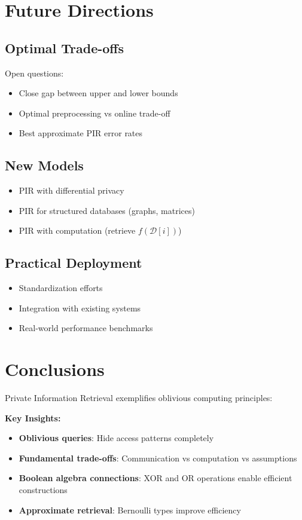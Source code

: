 \documentclass[11pt,final]{article}
\newcommand{\DB}{\mathcal{D}}
\begin{document}
\section{Future Directions}

\subsection{Optimal Trade-offs}

Open questions:
\begin{itemize}
    \item Close gap between upper and lower bounds
    \item Optimal preprocessing vs online trade-off
    \item Best approximate PIR error rates
\end{itemize}

\subsection{New Models}

\begin{itemize}
    \item PIR with differential privacy
    \item PIR for structured databases (graphs, matrices)
    \item PIR with computation (retrieve $f(\DB[i])$)
\end{itemize}

\subsection{Practical Deployment}

\begin{itemize}
    \item Standardization efforts
    \item Integration with existing systems
    \item Real-world performance benchmarks
\end{itemize}

\section{Conclusions}

Private Information Retrieval exemplifies oblivious computing principles:

\textbf{Key Insights:}
\begin{itemize}
    \item \textbf{Oblivious queries}: Hide access patterns completely
    \item \textbf{Fundamental trade-offs}: Communication vs computation vs assumptions
    \item \textbf{Boolean algebra connections}: XOR and OR operations enable efficient constructions
    \item \textbf{Approximate retrieval}: Bernoulli types improve efficiency
\end{itemize}
\end{document}

